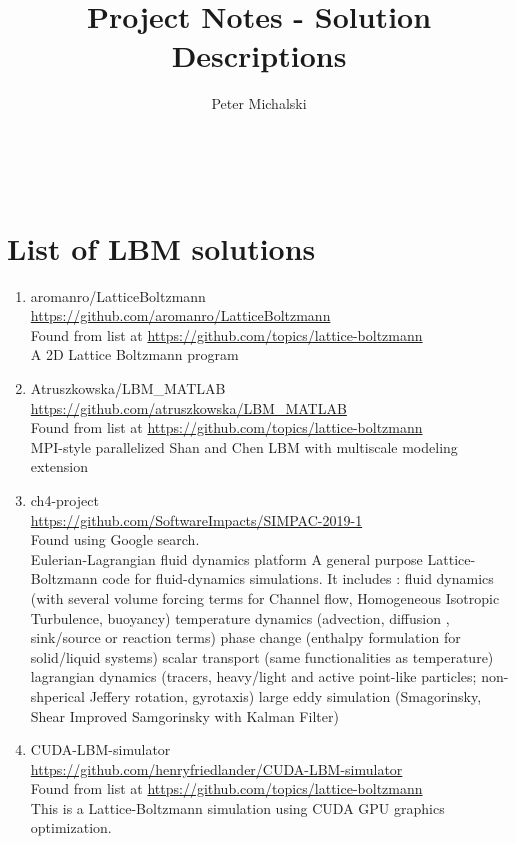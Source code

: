 \documentclass{article}
\title{Project Notes - Solution Descriptions}
\author{Peter Michalski}
\date{}
\begin{document}
\maketitle

~\newpage


\section{List of LBM solutions}
\begin{enumerate}
	\item aromanro/LatticeBoltzmann\\
	\href{https://github.com/aromanro/LatticeBoltzmann}{https://github.com/aromanro/LatticeBoltzmann}\\
	Found from list at \href{https://github.com/topics/lattice-boltzmann}{https://github.com/topics/lattice-boltzmann}\\
	A 2D Lattice Boltzmann program
	
	\item Atruszkowska/LBM\_MATLAB\\
	\href{https://github.com/atruszkowska/LBM_MATLAB}{https://github.com/atruszkowska/LBM\_MATLAB}\\
	Found from list at \href{https://github.com/topics/lattice-boltzmann}{https://github.com/topics/lattice-boltzmann}\\
	MPI-style parallelized Shan and Chen LBM with multiscale modeling extension
	
	\item ch4-project\\
	\href{https://github.com/SoftwareImpacts/SIMPAC-2019-1}{https://github.com/SoftwareImpacts/SIMPAC-2019-1}\\  
	Found using Google search.\\
	Eulerian-Lagrangian fluid dynamics platform
	A general purpose Lattice-Boltzmann code for fluid-dynamics simulations. It includes :
	fluid dynamics (with several volume forcing terms for Channel flow, Homogeneous Isotropic Turbulence, buoyancy)
	temperature dynamics (advection, diffusion , sink/source or reaction terms)
	phase change (enthalpy formulation for solid/liquid systems)
	scalar transport (same functionalities as temperature)
	lagrangian dynamics (tracers, heavy/light and active point-like particles; non-shperical Jeffery rotation, gyrotaxis)
	large eddy simulation (Smagorinsky, Shear Improved Samgorinsky with Kalman Filter)
	
	\item CUDA-LBM-simulator\\
	\href{https://github.com/henryfriedlander/CUDA-LBM-simulator}{https://github.com/henryfriedlander/CUDA-LBM-simulator}\\
	Found from list at \href{https://github.com/topics/lattice-boltzmann}{https://github.com/topics/lattice-boltzmann}\\
	This is a Lattice-Boltzmann simulation using CUDA GPU graphics optimization.
	

\end{enumerate}
\end{document}
